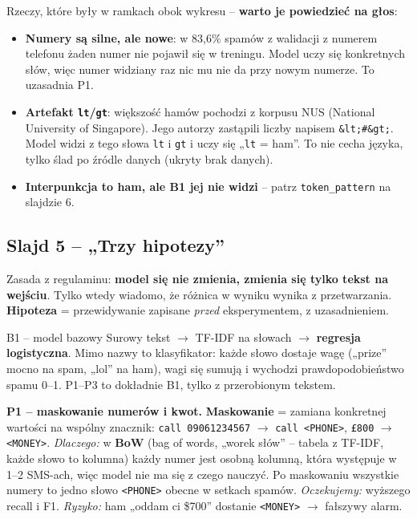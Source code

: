 \documentclass[11pt,a4paper]{article}
\begin{document}
Rzeczy, które były w ramkach obok wykresu -- \textbf{warto je powiedzieć na głos}:
\begin{itemize}
  \item \textbf{Numery są silne, ale nowe}: w 83,6\% spamów z walidacji z numerem telefonu żaden numer nie pojawił się w treningu.
        Model uczy się konkretnych słów, więc numer widziany raz nic mu nie da przy nowym numerze. To uzasadnia P1.
  \item \textbf{Artefakt \texttt{lt}/\texttt{gt}}: większość hamów pochodzi z korpusu NUS (National University of Singapore).
        Jego autorzy zastąpili liczby napisem \texttt{\&lt;\#\&gt;}. Model widzi z tego słowa \texttt{lt} i \texttt{gt} i uczy się
        „\texttt{lt} = ham”. To nie cecha języka, tylko ślad po źródle danych (ukryty brak danych).
  \item \textbf{Interpunkcja to ham, ale B1 jej nie widzi} -- patrz \texttt{token\_pattern} na slajdzie 6.
\end{itemize}

\subsection{Slajd 5 -- „Trzy hipotezy”}

Zasada z regulaminu: \textbf{model się nie zmienia, zmienia się tylko tekst na wejściu}. Tylko wtedy wiadomo, że różnica
w wyniku wynika z przetwarzania. \textbf{Hipoteza} = przewidywanie zapisane \emph{przed} eksperymentem, z uzasadnieniem.

\begin{pojecie}{B1 -- model bazowy}
Surowy tekst $\to$ TF-IDF na słowach $\to$ \textbf{regresja logistyczna}. Mimo nazwy to klasyfikator: każde słowo dostaje wagę
(„prize” mocno na spam, „lol” na ham), wagi się sumują i wychodzi prawdopodobieństwo spamu 0--1.
P1--P3 to dokładnie B1, tylko z przerobionym tekstem.
\end{pojecie}

\textbf{P1 -- maskowanie numerów i kwot.} \textbf{Maskowanie} = zamiana konkretnej wartości na wspólny znacznik:
\texttt{call 09061234567} $\to$ \texttt{call <PHONE>}, \texttt{£800} $\to$ \texttt{<MONEY>}.
\textit{Dlaczego:} w \textbf{BoW} (bag of words, „worek słów” -- tabela z TF-IDF, każde słowo to kolumna) każdy numer jest
osobną kolumną, która występuje w 1--2 SMS-ach, więc model nie ma się z czego nauczyć. Po maskowaniu wszystkie numery to
jedno słowo \texttt{<PHONE>} obecne w setkach spamów. \textit{Oczekujemy:} wyższego recall i F1.
\textit{Ryzyko:} ham „oddam ci \$700” dostanie \texttt{<MONEY>} $\to$ fałszywy alarm.
\end{document}

